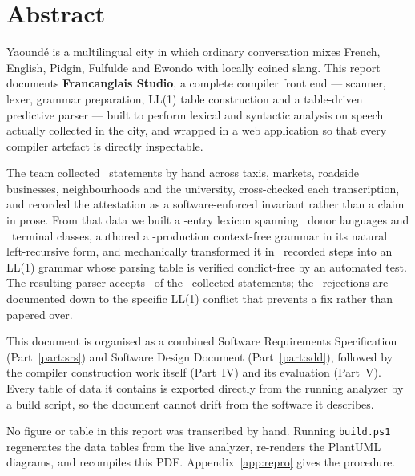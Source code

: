 \section*{Abstract}

Yaound\'e is a multilingual city in which ordinary conversation mixes French, English,
Pidgin, Fulfulde and Ewondo with locally coined slang. This report documents
\textbf{Francanglais Studio}, a complete compiler front end --- scanner, lexer, grammar
preparation, LL(1) table construction and a table-driven predictive parser --- built to
perform lexical and syntactic analysis on speech actually collected in the city, and
wrapped in a web application so that every compiler artefact is directly inspectable.

The team collected \CorpusTotal\ statements by hand across taxis, markets, roadside
businesses, neighbourhoods and the university, cross-checked each transcription, and
recorded the attestation as a software-enforced invariant rather than a claim in prose.
From that data we built a \LexiconTotal-entry lexicon spanning \OriginCount\ donor
languages and \TerminalCount\ terminal classes, authored a \ProductionCount-production
context-free grammar in its natural left-recursive form, and mechanically transformed it
in \LedgerSteps\ recorded steps into an LL(1) grammar whose parsing table is verified
conflict-free by an automated test. The resulting parser accepts \CorpusAccepted\ of the
\CorpusTotal\ collected statements; the \CorpusRejected\ rejections are documented down to
the specific LL(1) conflict that prevents a fix rather than papered over.

This document is organised as a combined Software Requirements Specification
(Part~\ref{part:srs}) and Software Design Document (Part~\ref{part:sdd}), followed by the
compiler construction work itself (Part~IV) and its evaluation (Part~V). Every table of
data it contains is exported directly from the running analyzer by a build script, so the
document cannot drift from the software it describes.

\vspace{0.8em}
\begin{keypoint}[Reproducibility]
No figure or table in this report was transcribed by hand. Running
\texttt{build.ps1} regenerates the data tables from the live analyzer, re-renders the
PlantUML diagrams, and recompiles this PDF. Appendix~\ref{app:repro} gives the procedure.
\end{keypoint}
